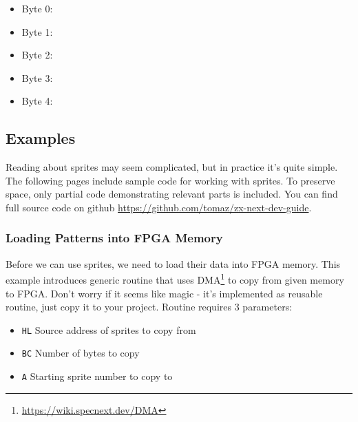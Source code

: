 \documentclass[12pt,twoside,openright,a4paper]{book}
\begin{document}
\begin{itemize}[topsep=1pt,itemsep=1pt]
	\item Byte 0: 
	\item Byte 1: 
	\item Byte 2: 
	\item Byte 3: 
	\item Byte 4: 
\end{itemize}


\subsection{Examples}

Reading about sprites may seem complicated, but in practice it's quite simple. The following pages include sample code for working with sprites. To preserve space, only partial code demonstrating relevant parts is included. You can find full source code on github \url{https://github.com/tomaz/zx-next-dev-guide}.


\pagebreak
\subsubsection{Loading Patterns into FPGA Memory}

Before we can use sprites, we need to load their data into FPGA memory. This example introduces generic routine that uses DMA\footnote{\url{https://wiki.specnext.dev/DMA}} to copy from given memory to FPGA. Don't worry if it seems like magic - it's implemented as reusable routine, just copy it to your project. Routine requires 3 parameters:

\begin{itemize}[topsep=1pt,itemsep=1pt]
	\item {\tt HL} Source address of sprites to copy from
	\item {\tt BC} Number of bytes to copy
	\item {\tt A} Starting sprite number to copy to
\end{itemize}
\end{document}
